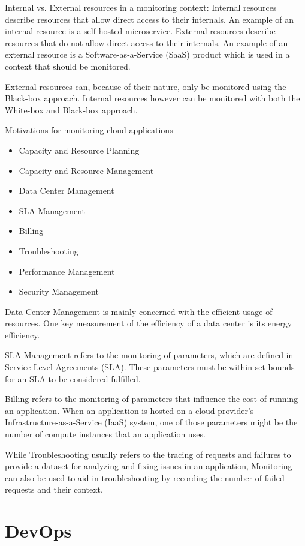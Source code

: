 Internal vs. External resources in a monitoring context:
Internal resources describe resources that allow direct access to their internals.
An example of an internal resource is a self-hosted microservice.
External resources describe resources that do not allow direct access to their internals.
An example of an external resource is a Software-as-a-Service (SaaS) product which is used in a context that should be monitored.

External resources can, because of their nature, only be monitored using the Black-box approach.
Internal resources however can be monitored with both the White-box and Black-box approach.

Motivations for monitoring cloud applications \cite{6483656}
\begin{itemize}
    \item Capacity and Resource Planning
    \item Capacity and Resource Management
    \item Data Center Management
    \item SLA Management
    \item Billing
    \item Troubleshooting
    \item Performance Management
    \item Security Management
\end{itemize}



Data Center Management is mainly concerned with the efficient usage of resources.
One key measurement of the efficiency of a data center is its energy efficiency.

SLA Management refers to the monitoring of parameters, which are defined in Service Level Agreements (SLA).
These parameters must be within set bounds for an SLA to be considered fulfilled.

Billing refers to the monitoring of parameters that influence the cost of running an application.
When an application is hosted on a cloud provider's Infrastructure-as-a-Service (IaaS) system,
one of those parameters might be the number of compute instances that an application uses.

While Troubleshooting usually refers to the tracing of requests and failures to provide a dataset for analyzing and fixing issues in an application,
Monitoring can also be used to aid in troubleshooting by recording the number of failed requests and their context.



\section{DevOps}

